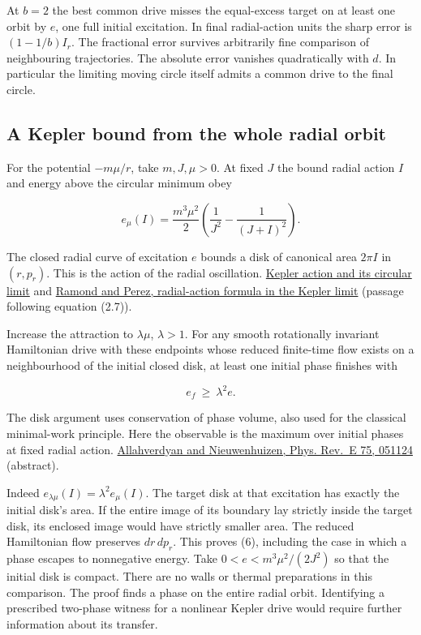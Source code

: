 \documentclass[11pt,a4paper]{article}
\begin{document}
At \(b=2\) the best common drive misses the equal-excess target on at
least one orbit by \(e\), one full initial excitation. In final
radial-action units the sharp error is \((1-1/b)I_r\). The fractional
error survives arbitrarily fine comparison of neighbouring trajectories.
The absolute error vanishes quadratically with \(d\). In particular the
limiting moving circle itself admits a common drive to the final circle.

\subsection{A Kepler bound from the whole radial
orbit}\label{a-kepler-bound-from-the-whole-radial-orbit}

For the potential \(-m\mu/r\), take \(m,J,\mu>0\). At fixed \(J\) the
bound radial action \(I\) and energy above the circular minimum obey

\[
 e_\mu(I)=\frac{m^3\mu^2}{2}
       \left(\frac1{J^2}-\frac1{(J+I)^2}\right).
\]

The closed radial curve of excitation \(e\) bounds a disk of canonical
area \(2\pi I\) in \((r,p_r)\). This is the action of the radial
oscillation.
\href{https://arivero.github.io/navstokgap/notes/rivero-1998-conjecture-central-forces.html\#hooke-and-kepler-radial-actions-and-maslov-phases}{Kepler
action and its circular limit} and
\href{https://physique.ensta-paris.fr/PAT/DM/paper_dm3.pdf}{Ramond and
Perez, radial-action formula in the Kepler limit} (passage following
equation (2.7)).

Increase the attraction to \(\lambda\mu\), \(\lambda>1\). For any smooth
rotationally invariant Hamiltonian drive with these endpoints whose
reduced finite-time flow exists on a neighbourhood of the initial closed
disk, at least one initial phase finishes with

\[
                    e_f\ \ge\ \lambda^2 e.                          \tag{6}
\]

The disk argument uses conservation of phase volume, also used for the
classical minimal-work principle. Here the observable is the maximum
over initial phases at fixed radial action.
\href{https://doi.org/10.1103/PhysRevE.75.051124}{Allahverdyan and
Nieuwenhuizen, Phys. Rev.~E 75, 051124} (abstract).

Indeed \(e_{\lambda\mu}(I)=\lambda^2 e_\mu(I)\). The target disk at that
excitation has exactly the initial disk's area. If the entire image of
its boundary lay strictly inside the target disk, its enclosed image
would have strictly smaller area. The reduced Hamiltonian flow preserves
\(dr\,dp_r\). This proves (6), including the case in which a phase
escapes to nonnegative energy. Take \(0<e<m^3\mu^2/(2J^2)\) so that the
initial disk is compact. There are no walls or thermal preparations in
this comparison. The proof finds a phase on the entire radial orbit.
Identifying a prescribed two-phase witness for a nonlinear Kepler drive
would require further information about its transfer.
\end{document}

